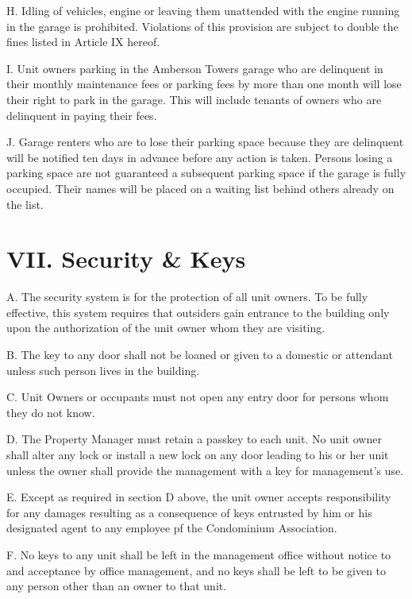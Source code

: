 \documentclass[
]{book}
\begin{document}
H. Idling of vehicles, engine or leaving them unattended with the engine running in the garage is prohibited. Violations of this provision are subject to double the fines listed in Article IX hereof.

I. Unit owners parking in the Amberson Towers garage who are delinquent in their monthly maintenance fees or parking fees by more than one month will lose their right to park in the garage. This will include tenants of owners who are delinquent in paying their fees.

J. Garage renters who are to lose their parking space because they are delinquent will be notified ten days in advance before any action is taken. Persons losing a parking space are not guaranteed a subsequent parking space if the garage is fully occupied. Their names will be placed on a waiting list behind others already on the list.

\hypertarget{vii.-security-keys-2}{%
\section*{VII. Security \& Keys}\label{vii.-security-keys-2}}

A. The security system is for the protection of all unit owners. To be fully effective, this system requires that outsiders gain entrance to the building only upon the authorization of the unit owner whom they are visiting.

B. The key to any door shall not be loaned or given to a domestic or attendant unless such person lives in the building.

C. Unit Owners or occupants must not open any entry door for persons whom they do not know.

D. The Property Manager must retain a passkey to each unit. No unit owner shall alter any lock or install a new lock on any door leading to his or her unit unless the owner shall provide the management with a key for management's use.

E. Except as required in section D above, the unit owner accepts responsibility for any damages resulting as a consequence of keys entrusted by him or his designated agent to any employee pf the Condominium Association.

F. No keys to any unit shall be left in the management office without notice to and acceptance by office management, and no keys shall be left to be given to any person other than an owner to that unit.
\end{document}
